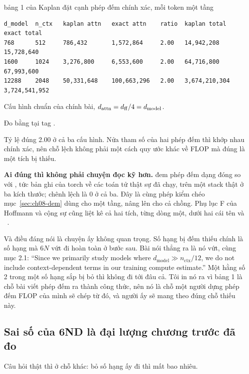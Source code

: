 \begin{measured}{bảng 1 của Kaplan đặt cạnh phép đếm chính xác, mỗi token một tầng}
\begin{verbatim}
d_model  n_ctx   kaplan attn   exact attn    ratio  kaplan total  exact total
768      512     786,432       1,572,864     2.00   14,942,208    15,728,640
1600     1024    3,276,800     6,553,600     2.00   64,716,800    67,993,600
12288    2048    50,331,648    100,663,296   2.00   3,674,210,304 3,724,541,952
\end{verbatim}

Cấu hình chuẩn của chính bài, \(d_{\mathrm{attn}} = d_{\mathrm{ff}}/4 = d_{\mathrm{model}}\).

Đo bằng  tại tag .
\end{measured}

Tỷ lệ đúng 2.00 ở cả ba cấu hình. Nửa tham số của hai phép đếm thì khớp nhau
chính xác, nên chỗ lệch không phải một cách quy ước khác về FLOP mà đúng là một
tích bị thiếu.

\textbf{Ai đúng thì không phải chuyện đọc kỹ hơn.} 
đem phép đếm dạng đóng so với , tức bản ghi của torch về
các toán tử thật sự đã chạy, trên một stack thật ở ba kích thước; chênh lệch là
0 ở cả ba. Đây là cùng phép kiểm chéo mục~\ref{sec:ch08-dem} dùng cho một tầng,
nâng lên cho cả chồng. Phụ lục F của Hoffmann và cộng sự cũng liệt kê cả hai
tích, từng dòng một, dưới hai cái tên  và
~\autocite{hoffmann2022chinchilla}.

Và điều đáng nói là chuyện ấy không quan trọng. Số hạng bị đếm thiếu chính là số
hạng mà \(6N\) vứt đi hoàn toàn ở bước sau. Bài nói thẳng ra là nó vứt, cùng
mục 2.1: \enquote{Since we primarily study models where \(d_{\mathrm{model}} \gg
n_{\mathrm{ctx}}/12\), we do not include context-dependent terms in our training
compute estimate.} Một hằng số 2 trong một số hạng sắp bị bỏ thì không đi tới
đâu cả. Tôi in nó ra vì bảng 1 là chỗ bài viết phép đếm ra thành công thức, nên
nó là chỗ một người dựng phép đếm FLOP của mình sẽ chép từ đó, và người ấy sẽ
mang theo đúng chỗ thiếu này.

\subsection*{Sai số của 6ND là đại lượng chương trước đã đo}

%
Câu hỏi thật thì ở chỗ khác: bỏ số hạng ấy đi thì mất bao nhiêu.

